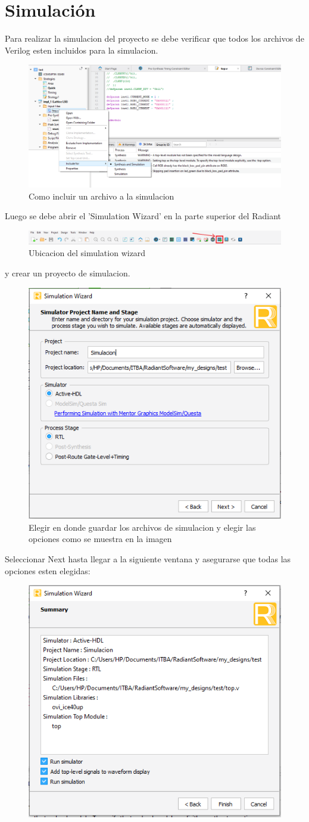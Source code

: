 \documentclass{article}
\begin{document}
\section{Simulación}
Para realizar la simulacion del proyecto se debe verificar que todos los archivos de Verilog esten incluidos para la simulacion.
	\begin{figure}[H]
	\centering
	\includegraphics[width=0.8\linewidth]{Imagenes/IncSim.png}
	\caption{Como incluir un archivo a la simulacion}
	\end{figure}
Luego se debe abrir el 'Simulation Wizard' en la parte superior del Radiant
	\begin{figure}[H]
	\centering
	\includegraphics[width=\linewidth]{Imagenes/SimWizardUb.png}
	\caption{Ubicacion del simulation wizard}
	\end{figure}
 y crear un proyecto de simulacion.
 	\begin{figure}[H]
	\centering
	\includegraphics[width=0.5\linewidth]{Imagenes/SimWizard1.png}
	\caption{Elegir en donde guardar los archivos de simulacion y elegir las opciones como se muestra en la imagen}
	\end{figure}
Seleccionar Next hasta llegar a la siguiente ventana y asegurarse que todas las opciones esten elegidas:
	\begin{figure}[H]
	\centering
	\includegraphics[width=0.5\linewidth]{Imagenes/SimWizard2.png}
	\end{figure}
\end{document}

